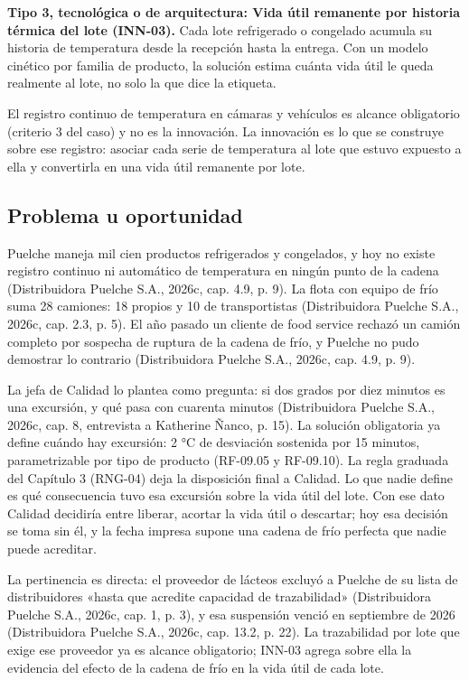 \textbf{Tipo 3, tecnológica o de arquitectura: Vida útil remanente por historia térmica del lote (INN-03).} Cada lote refrigerado o congelado acumula su historia de temperatura desde la recepción hasta la entrega. Con un modelo cinético por familia de producto, la solución estima cuánta vida útil le queda realmente al lote, no solo la que dice la etiqueta.

El registro continuo de temperatura en cámaras y vehículos es alcance obligatorio (criterio 3 del caso) y no es la innovación. La innovación es lo que se construye sobre ese registro: asociar cada serie de temperatura al lote que estuvo expuesto a ella y convertirla en una vida útil remanente por lote.

\subsection{Problema u oportunidad}

Puelche maneja mil cien productos refrigerados y congelados, y hoy no existe registro continuo ni automático de temperatura en ningún punto de la cadena (Distribuidora Puelche S.A., 2026c, cap. 4.9, p. 9). La flota con equipo de frío suma 28 camiones: 18 propios y 10 de transportistas (Distribuidora Puelche S.A., 2026c, cap. 2.3, p. 5). El año pasado un cliente de food service rechazó un camión completo por sospecha de ruptura de la cadena de frío, y Puelche no pudo demostrar lo contrario (Distribuidora Puelche S.A., 2026c, cap. 4.9, p. 9).

La jefa de Calidad lo plantea como pregunta: si dos grados por diez minutos es una excursión, y qué pasa con cuarenta minutos (Distribuidora Puelche S.A., 2026c, cap. 8, entrevista a Katherine Ñanco, p. 15). La solución obligatoria ya define cuándo hay excursión: 2 °C de desviación sostenida por 15 minutos, parametrizable por tipo de producto (RF-09.05 y RF-09.10). La regla graduada del Capítulo 3 (RNG-04) deja la disposición final a Calidad. Lo que nadie define es qué consecuencia tuvo esa excursión sobre la vida útil del lote. Con ese dato Calidad decidiría entre liberar, acortar la vida útil o descartar; hoy esa decisión se toma sin él, y la fecha impresa supone una cadena de frío perfecta que nadie puede acreditar.

La pertinencia es directa: el proveedor de lácteos excluyó a Puelche de su lista de distribuidores «hasta que acredite capacidad de trazabilidad» (Distribuidora Puelche S.A., 2026c, cap. 1, p. 3), y esa suspensión venció en septiembre de 2026 (Distribuidora Puelche S.A., 2026c, cap. 13.2, p. 22). La trazabilidad por lote que exige ese proveedor ya es alcance obligatorio; INN-03 agrega sobre ella la evidencia del efecto de la cadena de frío en la vida útil de cada lote.

